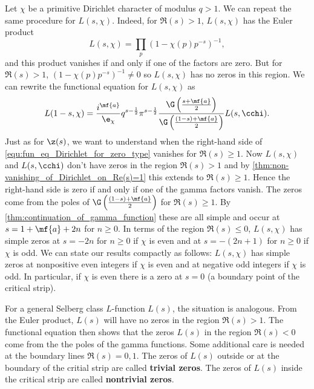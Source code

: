       Let $\chi$ be a primitive Dirichlet character of modulus $q > 1$. We can repeat the same procedure for $L(s,\chi)$. Indeed, for $\Re(s) > 1$, $L(s,\chi)$ has the Euler product
      \[
        L(s,\chi) = \prod_{p}(1-\chi(p)p^{-s})^{-1},
      \]
      and this product vanishes if and only if one of the factors are zero. But for $\Re(s) > 1$, $(1-\chi(p)p^{-s})^{-1} \neq 0$ so $L(s,\chi)$ has no zeros in this region. We can rewrite the functional equation for $L(s,\chi)$ as
      \begin{equation}\label{equ:fun_eq_Dirichlet_for_zero_type}
        L(1-s,\chi) = \frac{i^{\mf{a}}}{\e_{\chi}}q^{s-\frac{1}{2}}\pi^{s-\frac{1}{2}}\frac{\G\left(\frac{s+\mf{a}}{2}\right)}{\G\left(\frac{(1-s)+\mf{a}}{2}\right)}L(s,\cchi).
      \end{equation}
      Just as for $\z(s)$, we want to understand when the right-hand side of \cref{equ:fun_eq_Dirichlet_for_zero_type} vanishes for $\Re(s) \ge 1$. Now $L(s,\chi)$ and $L(s,\cchi)$ don't have zeros in the region $\Re(s) > 1$ and by \cref{thm:non-vanishing_of_Dirichlet_on_Re(s)=1} this extends to $\Re(s) \ge 1$. Hence the right-hand side is zero if and only if one of the gamma factors vanish. The zeros come from the poles of $\G\left(\frac{(1-s)+\mf{a}}{2}\right)$ for $\Re(s) \ge 1$. By \cref{thm:continuation_of_gamma_function} these are all simple and occur at $s = 1+\mf{a}+2n$ for $n \ge 0$. In terms of the region $\Re(s) \le 0$, $L(s,\chi)$ has simple zeros at $s = -2n$ for $n \ge 0$ if $\chi$ is even and at $s = -(2n+1)$ for $n \ge 0$ if $\chi$ is odd. We can state our results compactly as follows: $L(s,\chi)$ has simple zeros at nonpositive even integers if $\chi$ is even and at negative odd integers if $\chi$ is odd. In particular, if $\chi$ is even there is a zero at $s = 0$ (a boundary point of the critical strip).

      For a general Selberg class $L$-function $L(s)$, the situation is analogous. From the Euler product, $L(s)$ will have no zeros in the region $\Re(s) > 1$. The functional equation then shows that the zeros $L(s)$ in the region $\Re(s) < 0$ come from the the poles of the gamma functions. Some additional care is needed at the boundary lines $\Re(s) = 0,1$. The zeros of $L(s)$ outside or at the boundary of the critial strip are called \textbf{trivial zeros}. The zeros of $L(s)$ inside the critical strip are called \textbf{nontrivial zeros}.

